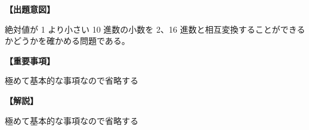\noindent \textbf{【出題意図】}

\noindent 絶対値が 1 より小さい 10 進数の小数を 2、16 進数と相互変換することができるかどうかを確かめる問題である。

\vspace{1em}
\noindent \textbf{【重要事項】}

\noindent 極めて基本的な事項なので省略する

\vspace{1em}
\noindent \textbf{【解説】}

\noindent 極めて基本的な事項なので省略する

